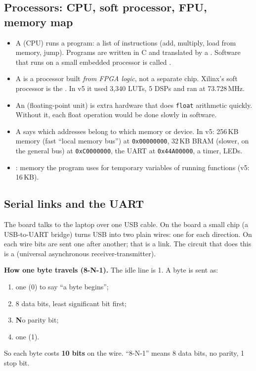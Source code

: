 \documentclass[11pt]{article}
\begin{document}
\subsection{Processors: CPU, soft processor, FPU, memory map}

\begin{itemize}
  \item A  (CPU) runs a program: a list of instructions (add, multiply, load from memory, jump). Programs are written in C and translated by a . Software that runs on a small embedded processor is called .
  \item A  is a processor built \emph{from FPGA logic}, not a separate chip. Xilinx's soft processor is the . In v5 it used 3,340 LUTs, 5 DSPs and ran at 73.728\,MHz.
  \item An  (floating-point unit) is extra hardware that does \texttt{float} arithmetic quickly. Without it, each float operation would be done slowly in software.
  \item A  says which addresses belong to which memory or device. In v5: 256\,KB  memory (fast ``local memory bus'') at \texttt{0x00000000}, 32\,KB  BRAM (slower, on the general bus) at \texttt{0xC0000000}, the UART at \texttt{0x44A00000}, a timer, LEDs.
  \item {}: memory the program uses for temporary variables of running functions (v5: 16\,KB).
\end{itemize}

\subsection{Serial links and the UART}
\label{sec:uart}

The board talks to the laptop over one USB cable. On the board a small chip (a USB-to-UART bridge) turns USB into two plain wires: one for each direction. On each wire bits are sent one after another; that is a  link. The circuit that does this is a  (universal asynchronous receiver-transmitter).

\textbf{How one byte travels (8-N-1).} The idle line is 1. A byte is sent as:
\begin{enumerate}
  \item one  (0) to say ``a byte begins'';
  \item 8 data bits, least significant bit first;
  \item \textbf{N}o parity bit;
  \item one  (1).
\end{enumerate}
So each byte costs \textbf{10 bits} on the wire. ``8-N-1'' means 8 data bits, no parity, 1 stop bit.
\end{document}
